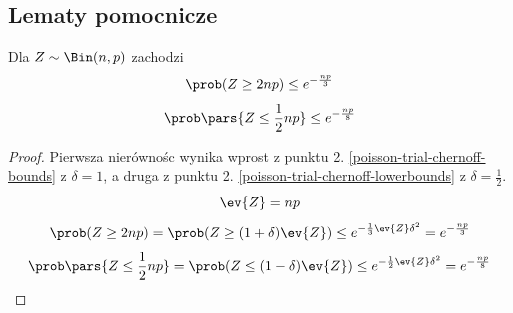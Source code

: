 \subsection{Lematy pomocnicze}
\begin{lemma}
	\label{chernow-for-power-of-two}
	Dla \(Z \sim \Bin(n, p)\) zachodzi
	\[
		\prob(Z \geq 2np) \leq e^{-\frac{np}{3}}
	\]
	\[
		\prob\pars{Z \leq \frac{1}{2}np} \leq e^{-\frac{np}{8}}
	\]
\end{lemma}
\begin{proof}
	Pierwsza nierównośc wynika wprost z punktu 2. \ref{poisson-trial-chernoff-bounds} z \(\delta = 1\), a druga z punktu 2. \ref{poisson-trial-chernoff-lowerbounds} z \(\delta = \frac{1}{2}\).
	\[
		\ev{Z} = np
	\]
	\[
		\prob(Z \geq 2np) = \prob(Z \geq (1 + \delta)\ev{Z}) \leq e^{-\frac{1}{3} \ev{Z} \delta^2} = e^{-\frac{np}{3}}
	\]
	\[
		\prob\pars{Z \leq \frac{1}{2}np} = \prob(Z \leq (1 - \delta)\ev{Z}) \leq e^{-\frac{1}{2} \ev{Z} \delta^2} = e^{-\frac{np}{8}}
	\]
\end{proof}

